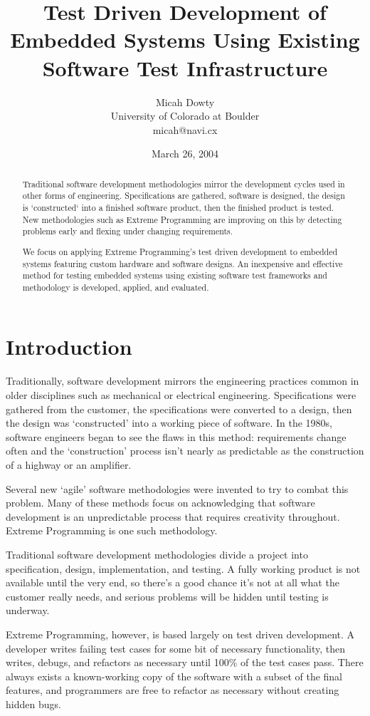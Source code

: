 \documentclass[letterpaper]{article}
\title{Test Driven Development of Embedded Systems Using Existing Software Test Infrastructure}
\author{Micah Dowty \\ University of Colorado at Boulder \\ micah@navi.cx}
\date{March 26, 2004}
\begin{document}
\maketitle
\begin{abstract}
Traditional software development methodologies mirror the development cycles used in other
forms of engineering. Specifications are gathered, software is designed, the design is
`constructed` into a finished software product, then the finished product is tested.
New methodologies such as Extreme Programming are improving on this by detecting problems
early and flexing under changing requirements.

We focus on applying Extreme
Programming's test driven development to embedded systems featuring custom hardware and
software designs. An inexpensive and effective method for testing embedded systems using existing
software test frameworks and methodology is developed, applied, and evaluated.
\end{abstract}

\section{Introduction}

Traditionally, software development mirrors the engineering practices common in older
disciplines such as mechanical or electrical engineering. Specifications were gathered
from the customer, the specifications were converted to a design, then the design was
`constructed' into a working piece of software. In the 1980s, software engineers began
to see the flaws in this method: requirements change often and the `construction' process
isn't nearly as predictable as the construction of a highway or an amplifier.

Several new `agile' software methodologies were invented to try to combat this problem.
Many of these methods focus on acknowledging that software development is an unpredictable
process that requires creativity throughout. Extreme Programming is one such methodology.

Traditional software development methodologies divide a project into specification, design, implementation,
and testing. A fully working product is not available until the very end, so there's a good
chance it's not at all what the customer really needs, and serious problems will be hidden
until testing is underway.

Extreme Programming, however, is based largely on test driven development. A developer
writes failing test cases for some bit of necessary functionality, then writes, debugs,
and refactors as necessary until 100\%
of the test cases pass. There always exists a known-working copy of the software with a subset
of the final features, and programmers are free to refactor as necessary without creating
hidden bugs.
\end{document}

